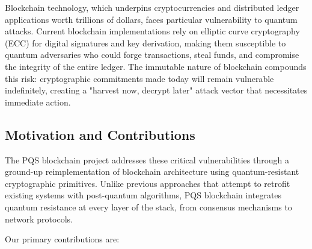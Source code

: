 \documentclass[12pt,a4paper]{article}
\begin{document}
Blockchain technology, which underpins cryptocurrencies and distributed ledger applications worth trillions of dollars, faces particular vulnerability to quantum attacks. Current blockchain implementations rely on elliptic curve cryptography (ECC) for digital signatures and key derivation, making them susceptible to quantum adversaries who could forge transactions, steal funds, and compromise the integrity of the entire ledger. The immutable nature of blockchain compounds this risk: cryptographic commitments made today will remain vulnerable indefinitely, creating a "harvest now, decrypt later" attack vector that necessitates immediate action.

\subsection{Motivation and Contributions}

The PQS blockchain project addresses these critical vulnerabilities through a ground-up reimplementation of blockchain architecture using quantum-resistant cryptographic primitives. Unlike previous approaches that attempt to retrofit existing systems with post-quantum algorithms, PQS blockchain integrates quantum resistance at every layer of the stack, from consensus mechanisms to network protocols.

Our primary contributions are:
\end{document}
